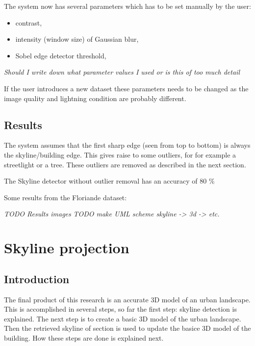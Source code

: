 \documentclass[10pt]{article}
\begin{document}
The system now has several parameters which has to be set manually by the user:
\begin{itemize}
	\item contrast,
	\item intensity (window size) of Gaussian blur,
	\item Sobel edge detector threshold,
\end{itemize}
\textit{Should I write down what parameter values I used or is this of too much
detail}

If the user introduces a new dataset these parameters needs to be changed
as the image quality and lightning condition are probably different.

 \subsection{Results}%
The system assumes that the first sharp edge (seen from top to bottom) is
always the skyline/building edge. This gives raise to some outliers, for 
for example a streetlight or a tree. These outliers are removed as described in
the next section.  

The Skyline detector without outlier removal has an accuracy of 80 \% 

Some results from the Floriande dataset:





\textit{ TODO Results images}
\textit{ TODO make UML scheme skyline -> 3d -> etc.}
\\

\section{Skyline projection}
 \subsection{Introduction}
The final product of this research is an accurate 3D model of an urban
landscape. This is accomplished in several steps, so far the first step: skyline detection is
explained. The next step is to create a basic 3D model of the urban landscape.
Then the retrieved skyline of section %
is used to update the basice 3D model of the building. How these steps are done is
explained next.
\end{document}
